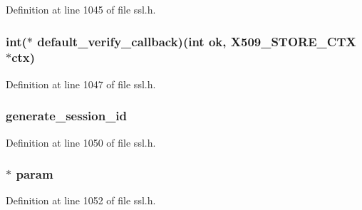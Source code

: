 Definition at line 1045 of file ssl.\+h.

\subsubsection[{\texorpdfstring{default\+\_\+verify\+\_\+callback}{default_verify_callback}}]{\setlength{\rightskip}{0pt plus 5cm}int($\ast$ default\+\_\+verify\+\_\+callback)(int ok, {\bf X509\+\_\+\+S\+T\+O\+R\+E\+\_\+\+C\+TX} $\ast$ctx)}\hypertarget{structssl__ctx__st_a926559d398d371b98329d281c7d3bc51}{}\label{structssl__ctx__st_a926559d398d371b98329d281c7d3bc51}


Definition at line 1047 of file ssl.\+h.

\subsubsection[{\texorpdfstring{generate\+\_\+session\+\_\+id}{generate_session_id}}]{ generate\+\_\+session\+\_\+id}\hypertarget{structssl__ctx__st_af147f6b9a405e9e8a94d7e5185381d57}{}\label{structssl__ctx__st_af147f6b9a405e9e8a94d7e5185381d57}


Definition at line 1050 of file ssl.\+h.

\subsubsection[{\texorpdfstring{param}{param}}]{ $\ast$ param}\hypertarget{structssl__ctx__st_a93a023e30bcb76ab78c9bdb0db7a24f8}{}\label{structssl__ctx__st_a93a023e30bcb76ab78c9bdb0db7a24f8}


Definition at line 1052 of file ssl.\+h.

